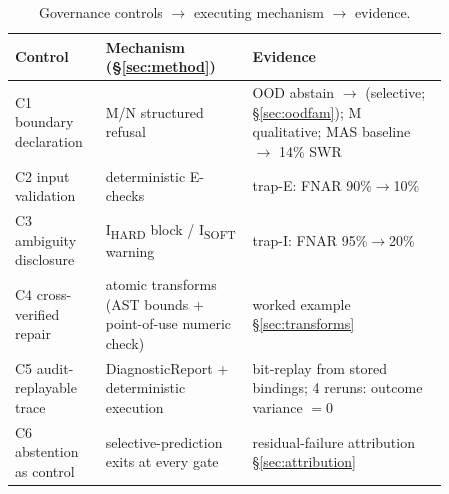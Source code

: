 \begin{table}[t]
\caption{Governance controls $\rightarrow$ executing mechanism $\rightarrow$ evidence.}
\label{tab:spine}
\small
\begin{tabular}{@{}p{0.16\linewidth}p{0.30\linewidth}p{0.40\linewidth}@{}}
\toprule
Control & Mechanism (\S\ref{sec:method}) & Evidence \\
\midrule
C1 boundary declaration & M/N structured refusal & OOD abstain \oodRPALabsOOD{}$\rightarrow$\oodVQabsOOD{} (selective; \S\ref{sec:oodfam}); M qualitative; MAS baseline $\rightarrow$ 14\% SWR \\
C2 input validation & deterministic E-checks & trap-E: FNAR 90\%$\rightarrow$10\% \\
C3 ambiguity disclosure & I\textsubscript{HARD} block / I\textsubscript{SOFT} warning & trap-I: FNAR 95\%$\rightarrow$20\% \\
C4 cross-verified repair & atomic transforms (AST bounds + point-of-use numeric check) & worked example \S\ref{sec:transforms} \\
C5 audit-replayable trace & DiagnosticReport + deterministic execution & bit-replay from stored bindings; 4 reruns: outcome variance $=0$ \\
C6 abstention as control & selective-prediction exits at every gate & residual-failure attribution \S\ref{sec:attribution} \\
\bottomrule
\end{tabular}
\end{table}

